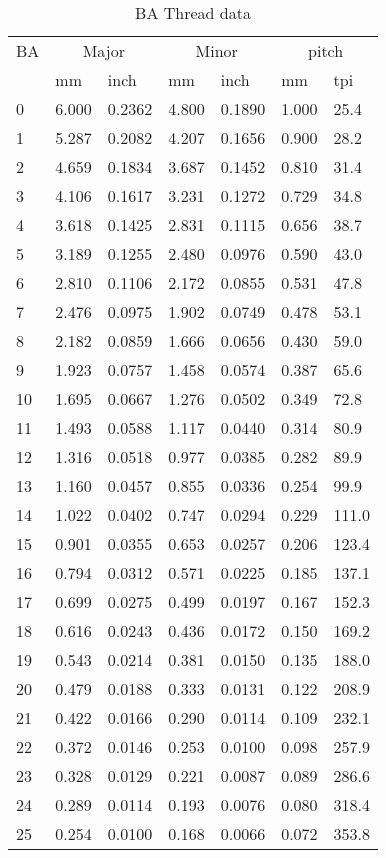 \begin{table}[h!]
    \footnotesize
\begin{longtable}{l|ll|ll|ll}
    BA
    &\multicolumn{2}{c}{Major}
    &\multicolumn{2}{c}{Minor}
    &\multicolumn{2}{c}{pitch}
    \\
    &mm
    &inch
    &mm
    &inch
    &mm
    &tpi
    \\
\hline
0 &6.000 &0.2362 &4.800 &0.1890 &1.000 & 25.4\\
1 &5.287 &0.2082 &4.207 &0.1656 &0.900 & 28.2\\
2 &4.659 &0.1834 &3.687 &0.1452 &0.810 & 31.4\\
3 &4.106 &0.1617 &3.231 &0.1272 &0.729 & 34.8\\
4 &3.618 &0.1425 &2.831 &0.1115 &0.656 & 38.7\\
5 &3.189 &0.1255 &2.480 &0.0976 &0.590 & 43.0\\
6 &2.810 &0.1106 &2.172 &0.0855 &0.531 & 47.8\\
7 &2.476 &0.0975 &1.902 &0.0749 &0.478 & 53.1\\
8 &2.182 &0.0859 &1.666 &0.0656 &0.430 & 59.0\\
9 &1.923 &0.0757 &1.458 &0.0574 &0.387 & 65.6\\
10 &1.695 &0.0667 &1.276 &0.0502 &0.349 & 72.8\\
11 &1.493 &0.0588 &1.117 &0.0440 &0.314 & 80.9\\
12 &1.316 &0.0518 &0.977 &0.0385 &0.282 & 89.9\\
13 &1.160 &0.0457 &0.855 &0.0336 &0.254 & 99.9\\
14 &1.022 &0.0402 &0.747 &0.0294 &0.229 &111.0\\
15 &0.901 &0.0355 &0.653 &0.0257 &0.206 &123.4\\
16 &0.794 &0.0312 &0.571 &0.0225 &0.185 &137.1\\
17 &0.699 &0.0275 &0.499 &0.0197 &0.167 &152.3\\
18 &0.616 &0.0243 &0.436 &0.0172 &0.150 &169.2\\
19 &0.543 &0.0214 &0.381 &0.0150 &0.135 &188.0\\
20 &0.479 &0.0188 &0.333 &0.0131 &0.122 &208.9\\
21 &0.422 &0.0166 &0.290 &0.0114 &0.109 &232.1\\
22 &0.372 &0.0146 &0.253 &0.0100 &0.098 &257.9\\
23 &0.328 &0.0129 &0.221 &0.0087 &0.089 &286.6\\
24 &0.289 &0.0114 &0.193 &0.0076 &0.080 &318.4\\
25 &0.254 &0.0100 &0.168 &0.0066 &0.072 &353.8\\
\end{longtable}
\caption{BA Thread data}
\end{table}
